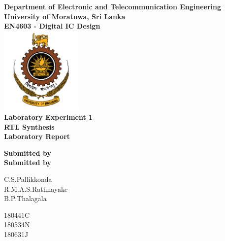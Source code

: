 \begin{titlepage}
\center %

\textbf{\large Department of Electronic and Telecommunication Engineering}\\[0.5cm]
\textbf{\Large University of Moratuwa, Sri Lanka}\\[1cm]
\textbf{\large EN4603 - Digital IC Design}\\[2cm]
\includegraphics[width=0.3\textwidth]{figures/uomlogo}\\[2cm]

	
\textbf{\Huge Laboratory Experiment 1 \\RTL Synthesis }\\[0.2cm]
\textbf{\Large Laboratory Report}\\[3cm]




\vfill

\textbf{\large Submitted by}\\[0.5cm]

\textbf{\large Submitted by}\\[2mm]
\begin{minipage}{0.3\textwidth}
	\begin{flushleft}
		{\large C.S.Pallikkonda}\\[2mm]
		{\large R.M.A.S.Rathnayake }\\[2mm]
		{\large B.P.Thalagala }\\[2mm]		
		
	\end{flushleft}
\end{minipage}
\hspace{2mm}
\begin{minipage}{0.2\textwidth}
	\begin{flushright}
		{\large 180441C }\\[2mm]
		{\large 180534N }\\[2mm]
		{\large 180631J }\\[2mm]


\end{flushright}
\end{minipage}
\end{titlepage}
